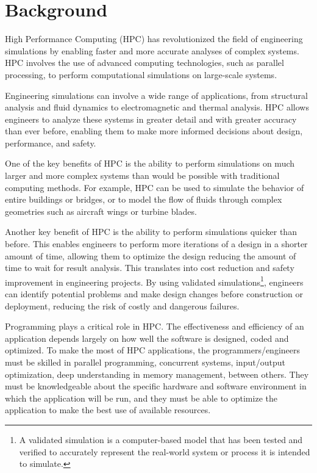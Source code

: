 \section{Background}

High Performance Computing (HPC) has revolutionized the field of engineering simulations by enabling faster and more accurate analyses of complex systems. HPC involves the use of advanced computing technologies, such as parallel processing, to perform computational simulations on large-scale systems.

Engineering simulations can involve a wide range of applications, from structural analysis and fluid dynamics to electromagnetic and thermal analysis. HPC allows engineers to analyze these systems in greater detail and with greater accuracy than ever before, enabling them to make more informed decisions about design, performance, and safety.

One of the key benefits of HPC is the ability to perform simulations on much larger and more complex systems than would be possible with traditional computing methods. For example, HPC can be used to simulate the behavior of entire buildings or bridges, or to model the flow of fluids through complex geometries such as aircraft wings or turbine blades.

Another key benefit of HPC is the ability to perform simulations quicker than before. This enables engineers to perform more iterations of a design in a shorter amount of time, allowing them to optimize the design reducing the amount of time to wait for result analysis. This translates into cost reduction and safety improvement in engineering projects. By using validated simulations\footnote{A validated simulation is a computer-based model that has been tested and verified to accurately represent the real-world system or process it is intended to simulate.}, engineers can identify potential problems and make design changes before construction or deployment, reducing the risk of costly and dangerous failures.

Programming plays a critical role in HPC. The effectiveness and efficiency of an application depends largely on how well the software is designed, coded and optimized. To make the most of HPC applications, the programmers/engineers must be skilled in parallel programming, concurrent systems, input/output optimization, deep understanding in memory management, between others. They must be knowledgeable about the specific hardware and software environment in which the application will be run, and they must be able to optimize the application to make the best use of available resources.

